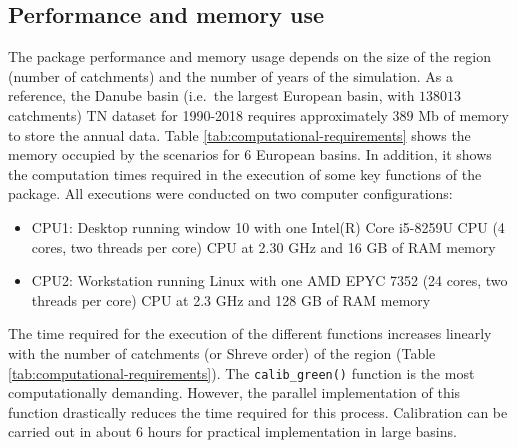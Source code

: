 \hypertarget{performance-and-memory-use}{%
\subsection{Performance and memory use}\label{performance-and-memory-use}}

The  package performance and memory usage depends on the size of the region (number of catchments) and the number of years of the simulation. As a reference, the Danube basin (i.e.~the largest European basin, with \(138013\) catchments) TN dataset for 1990-2018 requires approximately \(389\) Mb of memory to store the annual data. Table \ref{tab:computational-requirements} shows the memory occupied by the scenarios for 6 European basins. In addition, it shows the computation times required in the execution of some key functions of the package. All executions were conducted on two computer configurations:

\begin{itemize}
\item
  CPU1: Desktop running window 10 with one Intel(R) Core i5-8259U CPU (4 cores, two threads per core) CPU at 2.30 GHz and 16 GB of RAM memory
\item
  CPU2: Workstation running Linux with one AMD EPYC 7352 (24 cores, two threads per core) CPU at 2.3 GHz and 128 GB of RAM memory
\end{itemize}

\noindent The time required for the execution of the different functions increases linearly with the number of catchments (or Shreve order) of the region (Table \ref{tab:computational-requirements}). The \texttt{calib\_green()} function is the most computationally demanding. However, the parallel implementation of this function drastically reduces the time required for this process. Calibration can be carried out in about 6 hours for practical implementation in large basins.

